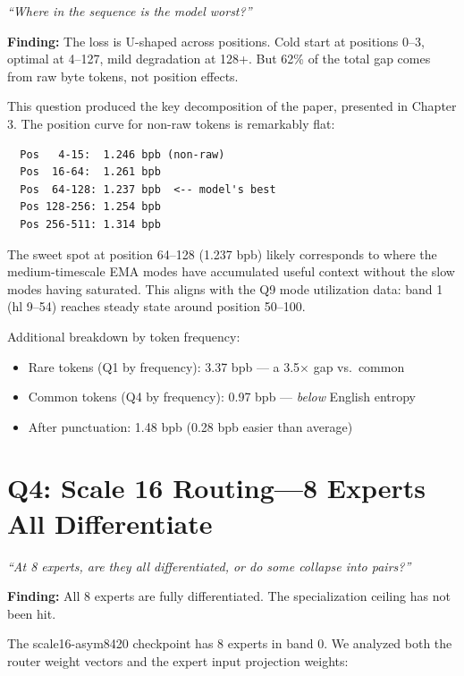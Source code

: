 \documentclass[11pt,a4paper]{report}
\newcommand{\cq}[1]{\textcolor{q}{\textit{``#1''}}}
\newcommand{\finding}[1]{\textcolor{finding}{\textbf{Finding:}} #1}
\begin{document}
\cq{Where in the sequence is the model worst?}

\finding{The loss is U-shaped across positions. Cold start at positions 0--3, optimal at 4--127, mild degradation at 128+. But 62\% of the total gap comes from raw byte tokens, not position effects.}

This question produced the key decomposition of the paper, presented in Chapter 3. The position curve for non-raw tokens is remarkably flat:

\begin{verbatim}
  Pos   4-15:  1.246 bpb (non-raw)
  Pos  16-64:  1.261 bpb
  Pos  64-128: 1.237 bpb  <-- model's best
  Pos 128-256: 1.254 bpb
  Pos 256-511: 1.314 bpb
\end{verbatim}

The sweet spot at position 64--128 (1.237 bpb) likely corresponds to where the medium-timescale EMA modes have accumulated useful context without the slow modes having saturated. This aligns with the Q9 mode utilization data: band 1 (hl 9--54) reaches steady state around position 50--100.

Additional breakdown by token frequency:
\begin{itemize}[nosep]
\item Rare tokens (Q1 by frequency): 3.37 bpb --- a 3.5$\times$ gap vs.\ common
\item Common tokens (Q4 by frequency): 0.97 bpb --- \emph{below} English entropy
\item After punctuation: 1.48 bpb (0.28 bpb easier than average)
\end{itemize}


\section{Q4: Scale 16 Routing---8 Experts All Differentiate}

\cq{At 8 experts, are they all differentiated, or do some collapse into pairs?}

\finding{All 8 experts are fully differentiated. The specialization ceiling has not been hit.}

The scale16-asym8420 checkpoint has 8 experts in band 0. We analyzed both the router weight vectors and the expert input projection weights:
\end{document}
